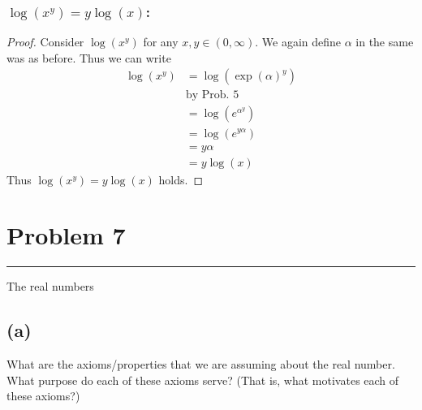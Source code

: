 \documentclass[12pt]{amsart}
\newcommand{\usec}[1]{%
  \section*{#1}%
  \noindent\rule{\textwidth}{2pt}%
  \vspace{10pt}%
}
\newcommand{\prob}[1]{Prob. #1}
\begin{document}
  \subsubsection*{$\log(x^y)=y\log(x)$:}%
  \label{ssub:_log_x_y_ylog_x_}

  \begin{proof}
    Consider $\log(x^y)$ for any $x,y\in(0,\infty)$. We again define $\alpha$ in
    the same was as before. Thus we can write
    \begin{align*}
      \log(x^y)&=\log(\exp(\alpha)^y)\\
               &\text{by \prob{5}}\\
               &=\log(e^{\alpha^y})\\
               &=\log(e^{y\alpha})\\
               &=y\alpha\\
               &=y\log(x)
    \end{align*}
    Thus $\log(x^y)=y\log(x)$ holds.
  \end{proof}

  \usec{Problem 7}%
  \label{sec:problem_7}

  The real numbers

  \subsection*{(a)}%
  \label{sub:_a_}

  What are the axioms/properties that we are assuming about the real number. What
  purpose do each of these axioms serve? (That is, what motivates each of these
  axioms?)
\end{document}

